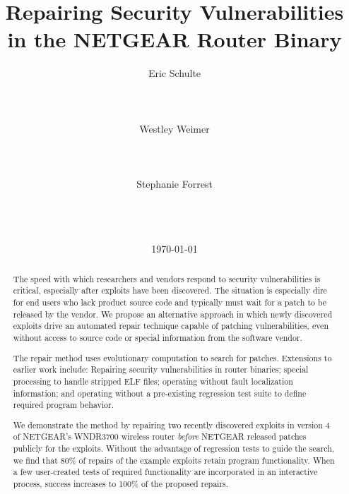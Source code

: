 \documentclass{sigcomm-alternate}
\date{\today}
\title{Repairing Security Vulnerabilities \\in the NETGEAR Router Binary}
\author{
%
%
\alignauthor
Eric Schulte\\
       \affaddr{Department of Computer Science}\\
       \affaddr{University of New Mexico}\\
       \affaddr{Albuquerque, NM 87131-0001}\\
       \email{eschulte@cs.unm.edu}
\alignauthor
Westley Weimer\\
       \affaddr{Department of Computer Science}\\
       \affaddr{University of Virginia}\\
       \affaddr{Charlottesville, VA 22904-4740}\\
       \email{weimer@cs.virginia.edu}
\alignauthor
Stephanie Forrest\\
       \affaddr{Department of Computer Science}\\
       \affaddr{University of New Mexico}\\
       \affaddr{Albuquerque, NM 87131-0001}\\
       \email{forrest@cs.unm.edu}
}
\begin{document}
\maketitle
\usetikzlibrary{arrows,decorations,decorations.pathreplacing,shapes}

\begin{abstract}
The speed with which researchers and vendors respond to security
vulnerabilities is critical, especially after exploits have been discovered.
The situation is especially dire for end users who lack
product source code and typically must wait for a patch to be released
by the vendor.
We propose an alternative approach in which newly discovered
exploits drive an automated repair technique capable of patching
vulnerabilities, even without access to source code or special
information from the software vendor.

The repair method uses evolutionary computation to search for patches.
Extensions to earlier work include: Repairing security vulnerabilities
in router binaries; special processing to handle stripped ELF files;
operating without fault localization information; and operating
without a pre-existing regression test suite to define required
program behavior.

We demonstrate the method by repairing two recently discovered exploits
in version 4 of NETGEAR's WNDR3700 wireless router \emph{before}
NETGEAR released patches publicly for the exploits. 
Without the advantage of regression tests to guide the search, we find that 80\% of
repairs of the example exploits retain program functionality.
When a few user-created tests of required functionality are
incorporated in an interactive process, success increases to 100\% of
the proposed repairs.

\end{abstract}
\end{document}
